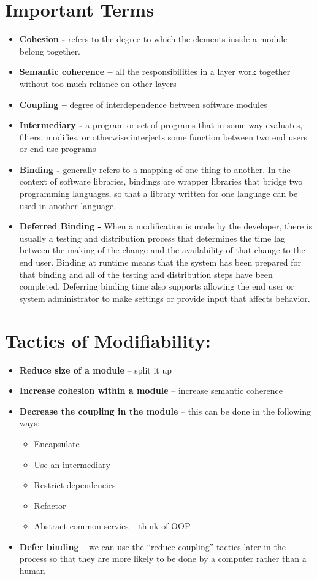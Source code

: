 \documentclass{report}
\begin{document}
\section{Important Terms}
\begin{itemize}
\item \textbf{Cohesion -} refers to the degree to which the elements inside a module belong together.
\item \textbf{Semantic coherence –} all the responsibilities in a layer work together without too much reliance on other layers
\item \textbf{Coupling –} degree of interdependence between software modules
\item \textbf{Intermediary -} a program or set of programs that in some way evaluates, filters, modifies, or otherwise interjects some function between two end users or end-use programs
\item \textbf{Binding -} generally refers to a mapping of one thing to another. In the context of software libraries, bindings are wrapper libraries that bridge two programming languages, so that a library written for one language can be used in another language.
\item \textbf{Deferred Binding -} When a modification is made by the developer, there is usually a testing and distribution process that determines the time lag between the making of the change and the availability of that change to the end user. Binding at runtime means that the system has been prepared for that binding and all of the testing and distribution steps have been completed. Deferring binding time also supports allowing the end user or system administrator to make settings or provide input that affects behavior.
\end{itemize}

\section{Tactics of Modifiability:}
\begin{itemize}
  \item \textbf{Reduce size of a module} – split it up
  \item \textbf{Increase cohesion within a module} – increase semantic coherence
  \item \textbf{Decrease the coupling in the module} – this can be done in the following ways:
   \begin{itemize}
   \item Encapsulate
   \item Use an intermediary
   \item Restrict dependencies
   \item Refactor
   \item Abstract common servies – think of OOP
   \end{itemize}
   \item \textbf{Defer binding} – we can use the “reduce coupling” tactics later in the process so that they   are more likely to be done by a computer rather than a human
\end{itemize}
\end{document}

